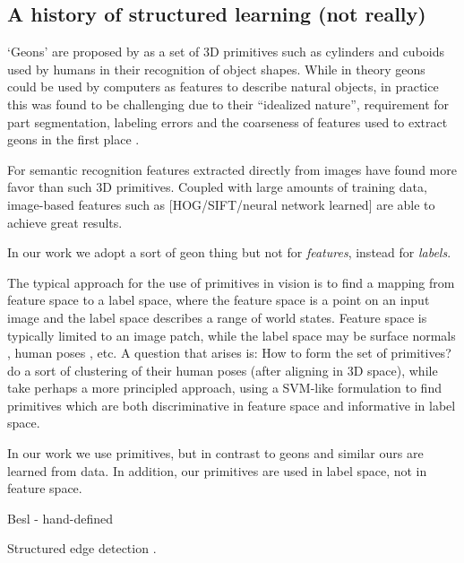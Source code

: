 \documentclass[10pt,twocolumn,letterpaper]{article}
\begin{document}
\subsection{A history of structured learning (not really)}

`Geons' are proposed by \cite{bieberman-rbc-1987} as a set of 3D primitives such as cylinders and cuboids used by humans in their recognition of object shapes.
While in theory geons could be used by computers  as features to describe natural objects, in practice this was found to be challenging due to their ``idealized nature'', requirement for part segmentation, labeling errors and the coarseness of features used to extract geons in the first place \cite{dickinson-iavc-1997}.

For semantic recognition features extracted directly from images have found more favor than such 3D primitives.
Coupled with large amounts of training data, image-based features such as [HOG/SIFT/neural network learned] are able to achieve great results.

In our work we adopt a sort of geon thing but not for \emph{features}, instead for \emph{labels}.

The typical approach for the use of primitives in vision is to find a mapping from feature space to a label space, where the feature space is a point on an input image and the label space describes a range of world states. 
Feature space is typically limited to an image patch, while the label space may be surface normals \cite{fouhey-iccv-2013}, human poses \cite{bourdev-iccv-2009}, etc.
A question that arises is: How to form the set of primitives?
\cite{bourdev-iccv-2009} do a sort of clustering of their human poses (after aligning in 3D space), while \cite{fouhey-iccv-2013} take perhaps a more principled approach, using a SVM-like formulation to find primitives which are both discriminative in feature space and informative in label space.

In our work we use primitives, but in contrast to geons and similar ours are learned from data.
In addition, our primitives are used in label space, not in feature space.


Besl - hand-defined

Structured edge detection \cite{dollar-iccv-2013}.
\end{document}
